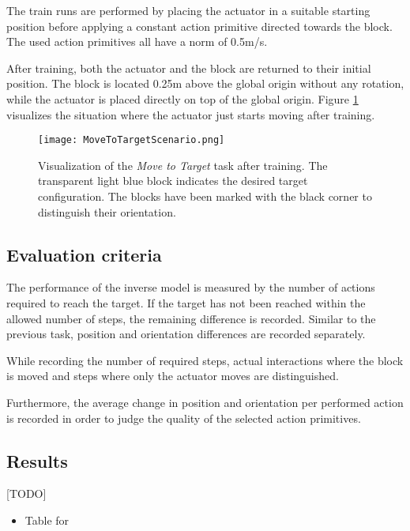 The train runs are performed by placing the actuator in a suitable starting position before applying a constant action primitive directed towards the block.
The used action primitives all have a norm of 0.5m/s.

After training, both the actuator and the block are returned to their initial position. The block is located 0.25m above the global origin without any rotation, while the actuator is placed directly on top of the global origin.
Figure \ref{fig:moveToTargetScenario} visualizes the situation where the actuator just starts moving after training.

\begin{figure}
\centering
\texttt{[image: MoveToTargetScenario.png]}
\caption{Visualization of the \textit{Move to Target} task after training. The transparent light blue block indicates the desired target configuration. The blocks have been marked with the black corner to distinguish their orientation.}
\label{fig:moveToTargetScenario}
\end{figure}

\subsection{Evaluation criteria}

The performance of the inverse model is measured by the number of actions required to reach the target. If the target has not been reached within the allowed number of steps, the remaining difference is recorded. Similar to the previous task, position and orientation differences are recorded separately.

While recording the number of required steps, actual interactions where the block is moved and steps where only the actuator moves are distinguished.

Furthermore, the average change in position and orientation per performed action is recorded in order to judge the quality of the selected action primitives.

\subsection{Results}
[TODO]

\begin{itemize}
\item Table for 
\end{itemize}

